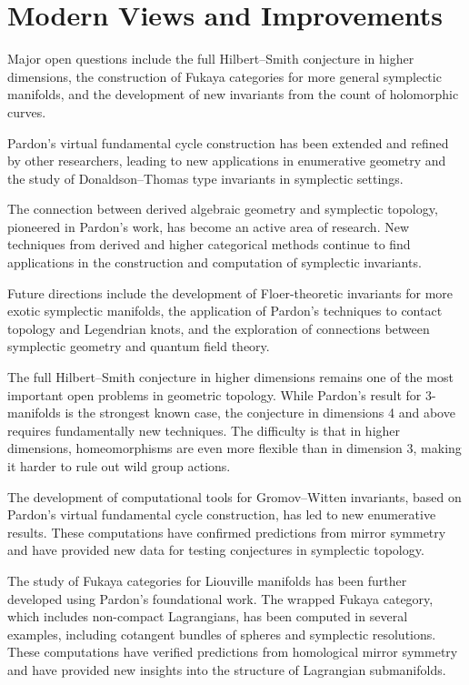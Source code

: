 \section{Modern Views and Improvements}

Major open questions include the full Hilbert--Smith conjecture in higher dimensions, the construction of Fukaya categories for more general symplectic manifolds, and the development of new invariants from the count of holomorphic curves.

Pardon's virtual fundamental cycle construction has been extended and refined by other researchers, leading to new applications in enumerative geometry and the study of Donaldson--Thomas type invariants in symplectic settings.

The connection between derived algebraic geometry and symplectic topology, pioneered in Pardon's work, has become an active area of research. New techniques from derived and higher categorical methods continue to find applications in the construction and computation of symplectic invariants.

Future directions include the development of Floer-theoretic invariants for more exotic symplectic manifolds, the application of Pardon's techniques to contact topology and Legendrian knots, and the exploration of connections between symplectic geometry and quantum field theory.

The full Hilbert--Smith conjecture in higher dimensions remains one of the most important open problems in geometric topology. While Pardon's result for 3-manifolds is the strongest known case, the conjecture in dimensions 4 and above requires fundamentally new techniques. The difficulty is that in higher dimensions, homeomorphisms are even more flexible than in dimension 3, making it harder to rule out wild group actions.

The development of computational tools for Gromov--Witten invariants, based on Pardon's virtual fundamental cycle construction, has led to new enumerative results. These computations have confirmed predictions from mirror symmetry and have provided new data for testing conjectures in symplectic topology.

The study of Fukaya categories for Liouville manifolds has been further developed using Pardon's foundational work. The wrapped Fukaya category, which includes non-compact Lagrangians, has been computed in several examples, including cotangent bundles of spheres and symplectic resolutions. These computations have verified predictions from homological mirror symmetry and have provided new insights into the structure of Lagrangian submanifolds.

